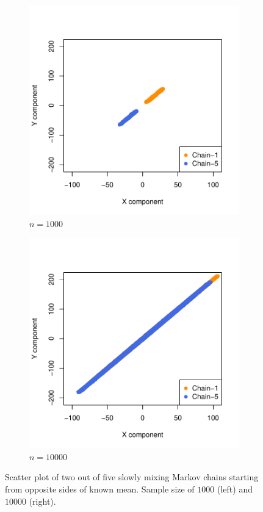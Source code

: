 \documentclass[11pt]{article}
\theoremstyle{remark}
\begin{document}
 \begin{figure}[h]
     \centering
     \begin{subfigure}[h]{0.4\textwidth}
          \centering
          \includegraphics[width=\textwidth]{plots/var-sp_n1e3.pdf}
          \caption{$n = 1000$}
          \label{subfig:var-sp_1000}
      \end{subfigure}
      \begin{subfigure}[h]{0.4\textwidth}
          \centering
          \includegraphics[width=\textwidth]{plots/var-sp_n1e4.pdf}
          \caption{$n = 10000$}
          \label{subfig:var-sp_10000}
      \end{subfigure}
     \caption{Scatter plot of two out of five slowly mixing Markov chains starting from opposite sides of known mean.  Sample size of $1000$ (left) and $10000$ (right).}
     \label{fig:var-sp}
 \end{figure}
\end{document}
